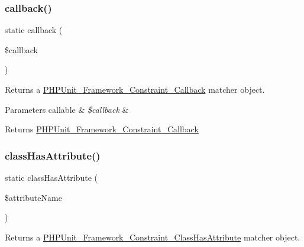 \subsubsection{\texorpdfstring{callback()}{callback()}}
{\footnotesize\ttfamily static callback (\begin{DoxyParamCaption}\item[{}]{\$callback }\end{DoxyParamCaption})\hspace{0.3cm}{\ttfamily [static]}}

Returns a \mbox{\hyperlink{class_p_h_p_unit___framework___constraint___callback}{P\+H\+P\+Unit\+\_\+\+Framework\+\_\+\+Constraint\+\_\+\+Callback}} matcher object.


\begin{DoxyParams}[1]{Parameters}
callable & {\em \$callback} & \\
\hline
\end{DoxyParams}
\begin{DoxyReturn}{Returns}
\mbox{\hyperlink{class_p_h_p_unit___framework___constraint___callback}{P\+H\+P\+Unit\+\_\+\+Framework\+\_\+\+Constraint\+\_\+\+Callback}} 
\end{DoxyReturn}
\mbox{\label{class_p_h_p_unit___framework___assert_a3b08089350dbb6db9218ff669400f9a3}} 
\subsubsection{\texorpdfstring{class\+Has\+Attribute()}{classHasAttribute()}}
{\footnotesize\ttfamily static class\+Has\+Attribute (\begin{DoxyParamCaption}\item[{}]{\$attribute\+Name }\end{DoxyParamCaption})\hspace{0.3cm}{\ttfamily [static]}}

Returns a \mbox{\hyperlink{class_p_h_p_unit___framework___constraint___class_has_attribute}{P\+H\+P\+Unit\+\_\+\+Framework\+\_\+\+Constraint\+\_\+\+Class\+Has\+Attribute}} matcher object.


